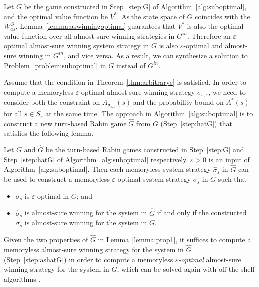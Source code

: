 \documentclass[runningheads,a4paper]{llncs}
\begin{document}
Let $G$ be the game constructed in Step~\ref{step:G} of Algorithm~\ref{alg:suboptimal}, and the optimal value function be $V^*$. As the state space of $G$ coincides with the $W_{as}^{G}$, Lemma~\ref{lemma:aswinningoptimal} guarantees that $V^*$ is also the optimal value function over all almost-sure winning strategies in $G^{in}$. Therefore an $\varepsilon$-optimal almost-sure winning system strategy in $G$ is also $\varepsilon$-optimal and almost-sure winning in $G^{in}$, and vice versa. As a result, we can synthesize a solution to Problem~\ref{problem:suboptimal} in $G$ instead of $G^{in}$.

Assume that the condition in Theorem~\ref{thm:arbitrarye} is satisfied. In order to compute a memoryless $\varepsilon$-optimal almost-sure winning strategy $\sigma_{s,\varepsilon}$, we need to consider both the constraint on $A_{\sigma_{s,\varepsilon}}(s)$ and the probability bound on $A^*(s)$ for all $s \in S_s$ at the same time. 
The approach in Algorithm~\ref{alg:suboptimal} is to construct a new turn-based Rabin game $\hat{G}$ from $G$ (Step~\ref{step:hatG}) that satisfies the following lemma. 






\begin{lemma}
Let $G$ and $\hat{G}$ be the turn-based Rabin games constructed in Step~\ref{step:G} and Step~\ref{step:hatG} of Algorithm~\ref{alg:suboptimal} respectively. $\varepsilon > 0$ is an input of Algorithm~\ref{alg:suboptimal}. 
Then each memoryless system strategy $\hat{\sigma}_s$ in $\hat{G}$ can be used to construct a memoryless $\varepsilon$-optimal system strategy $\sigma_s$ in $G$ such that
\begin{itemize}
\item $\sigma_s$ is $\varepsilon$-optimal in $G$; and
\item $\hat{\sigma}_s$ is almost-sure winning for the system in $\hat{G}$ if and only if the constructed $\sigma_s$ is almost-sure winning for the system in $G$. 
\end{itemize}
\label{lemma:prop1}
\end{lemma}








Given the two properties of $\hat{G}$ in Lemma~\ref{lemma:prop1}, 
it suffices to compute a memoryless almost-sure winning strategy for the system in $\hat{G}$ (Step~\ref{step:ashatG}) in order to compute a memoryless \emph{$\varepsilon$-optimal} almost-sure winning strategy for the system in $G$, which can be solved again with off-the-shelf algorithms \cite{chatterjee2005complexity, chatterjee2006strategy}. 
\end{document}
